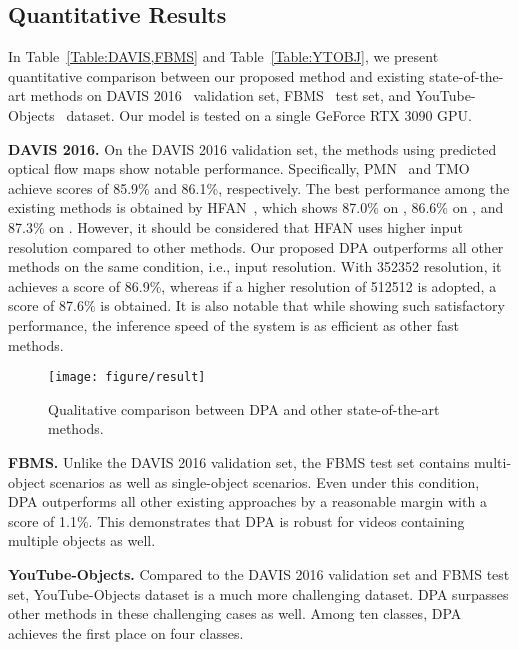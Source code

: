 \documentclass[10pt,twocolumn,letterpaper]{article}
\begin{document}
\subsection{Quantitative Results}
\label{quanti}
In Table~\ref{Table:DAVIS,FBMS} and Table~\ref{Table:YTOBJ}, we present quantitative comparison between our proposed method and existing state-of-the-art methods on DAVIS 2016~\cite{DAVIS} validation set, FBMS~\cite{FBMS} test set, and YouTube-Objects~\cite{YTOBJ} dataset. Our model is tested on a single GeForce RTX 3090 GPU.

\vspace{1mm}
\noindent\textbf{DAVIS 2016.} On the DAVIS 2016 validation set, the methods using predicted optical flow maps show notable performance. Specifically, PMN~\cite{PMN} and TMO~\cite{TMO} achieve  scores of 85.9\% and 86.1\%, respectively. The best performance among the existing methods is obtained by HFAN~\cite{HFAN}, which shows 87.0\% on , 86.6\% on , and 87.3\% on . However, it should be considered that HFAN uses higher input resolution compared to other methods. Our proposed DPA outperforms all other methods on the same condition, i.e., input resolution. With 352352 resolution, it achieves a  score of 86.9\%, whereas if a higher resolution of 512512 is adopted, a  score of 87.6\% is obtained. It is also notable that while showing such satisfactory performance, the inference speed of the system is as efficient as other fast methods. 

\begin{figure*}[t]
\centering
\texttt{[image: figure/result]}
\caption{Qualitative comparison between DPA and other state-of-the-art methods.}
\label{figure6}
\end{figure*}



\vspace{1mm}
\noindent\textbf{FBMS.} Unlike the DAVIS 2016 validation set, the FBMS test set contains multi-object scenarios as well as single-object scenarios. Even under this condition, DPA outperforms all other existing approaches by a reasonable margin with a  score of 1.1\%. This demonstrates that DPA is robust for videos containing multiple objects as well.


\vspace{1mm}
\noindent\textbf{YouTube-Objects.} Compared to the DAVIS 2016 validation set and FBMS test set, YouTube-Objects dataset is a much more challenging dataset. DPA surpasses other methods in these challenging cases as well. Among ten classes, DPA achieves the first place on four classes. 
\end{document}
